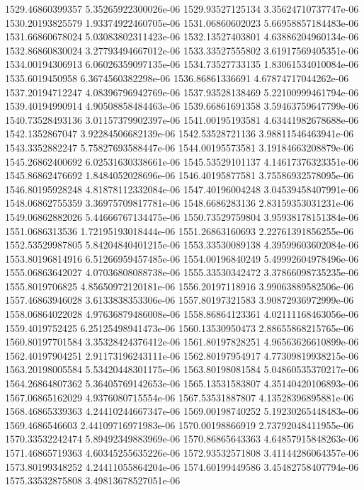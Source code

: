 {1529.46860399357 5.35265922300026e-06
1529.93527125134 3.35624710737747e-06
1530.20193825579 1.93374922460705e-06
1531.06860602023 5.66958857184483e-06
1531.66860678024 5.03083802311423e-06
1532.13527403801 4.63886204960134e-06
1532.86860830024 3.27793494667012e-06
1533.33527555802 3.61917569405351e-06
1534.00194306913 6.06026359097135e-06
1534.73527733135 1.83061534010084e-06
1535.6019450958 6.3674560382298e-06
1536.86861336691 4.67874717044262e-06
1537.20194712247 4.08396796942769e-06
1537.93528138469 5.22100999461794e-06
1539.40194990914 4.90508858484463e-06
1539.66861691358 3.59463759647799e-06
1540.73528493136 3.01157379902397e-06
1541.00195193581 4.63441982678688e-06
1542.1352867047 3.92284506682139e-06
1542.53528721136 3.98811546463941e-06
1543.3352882247 5.75827693588447e-06
1544.00195573581 3.19184663208879e-06
1545.26862400692 6.02531630338661e-06
1545.53529101137 4.14617376323351e-06
1545.86862476692 1.8484052028696e-06
1546.40195877581 3.75586932578095e-06
1546.80195928248 4.81878112332084e-06
1547.40196004248 3.04539458407991e-06
1548.06862755359 3.36975709817781e-06
1548.6686283136 2.83159353031231e-06
1549.06862882026 5.44666767134475e-06
1550.73529759804 3.95938178151384e-06
1551.0686313536 1.72195193018444e-06
1551.26863160693 2.22761391856255e-06
1552.53529987805 5.84204840401215e-06
1553.33530089138 4.39599603602084e-06
1553.80196814916 6.51266959457485e-06
1554.00196840249 5.49992604978496e-06
1555.06863642027 4.07036808088738e-06
1555.33530342472 3.37866098735235e-06
1555.8019706825 4.85650972120181e-06
1556.20197118916 3.99063889582506e-06
1557.46863946028 3.6133838353306e-06
1557.80197321583 3.90872936972999e-06
1558.06864022028 4.97636879486008e-06
1558.86864123361 4.02111168463056e-06
1559.4019752425 6.25125498941473e-06
1560.13530950473 2.88655868215765e-06
1560.80197701584 3.35328424376412e-06
1561.80197828251 4.96563626610899e-06
1562.40197904251 2.91173196243111e-06
1562.80197954917 4.77309819938215e-06
1563.20198005584 5.53420448301175e-06
1563.80198081584 5.04860535370217e-06
1564.26864807362 5.36405769142653e-06
1565.13531583807 4.35140420106893e-06
1567.06865162029 4.9376080715554e-06
1567.53531887807 4.13528396895881e-06
1568.46865339363 4.24410244667347e-06
1569.00198740252 5.19230265448483e-06
1569.4686546603 2.44109716971983e-06
1570.00198866919 2.73792048411955e-06
1570.33532242474 5.89492349883969e-06
1570.86865643363 4.64857915848263e-06
1571.46865719363 4.60345255635226e-06
1572.93532571808 3.41144286064357e-06
1573.80199348252 4.24411055864204e-06
1574.60199449586 3.45482758407794e-06
1575.33532875808 3.49813678527051e-06
}

